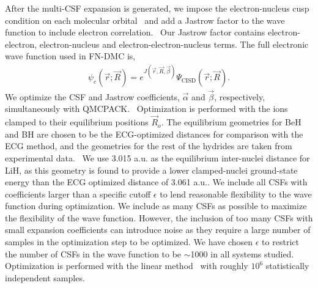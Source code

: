 \documentclass[aip,jcp,numerical,reprint]{revtex4-1}
\begin{document}
After the multi-CSF expansion is generated, we impose the electron-nucleus cusp condition on each molecular orbital~\cite{cusp} and add a Jastrow factor to the wave function to include electron correlation.~\cite{Kato} Our Jastrow factor contains electron-electron, electron-nucleus and electron-electron-nucleus terms. The full electronic wave function used in FN-DMC is,
\begin{align}
\psi_e(\vec{r};\vec{R})=e^{J(\vec{r},\vec{R},\vec{\beta})}\Psi_{\text{CISD}}(\vec{r};\vec{R})\label{eq:psie}.
\end{align}
We optimize the CSF and Jastrow coefficients, $\vec{\alpha}$ and $\vec{\beta}$, respectively, simultaneously with QMCPACK.~\cite{QMCPACK_Kim,QMCPACK_Esler} Optimization is performed with the ions clamped to their equilibrium positions $\vec{R}_o$. The equilibrium geometries for BeH and BH are chosen to be the ECG-optimized distances for comparison with the ECG method, and the geometries for the rest of the hydrides are taken from experimental data.~\cite{CCCBDB} We use 3.015 a.u. as the equilibrium inter-nuclei distance for LiH, as this geometry is found to provide a lower clamped-nuclei ground-state energy than the ECG optimized distance of 3.061 a.u.. We include all CSFs with coefficients larger than a specific cutoff $\epsilon$ to lend reasonable flexibility to the wave function during optimization. We include as many CSFs as possible to maximize the flexibility of the wave function. However, the inclusion of too many CSFs with small expansion coefficients can introduce noise as they require a large number of samples in the optimization step to be optimized. We have chosen $\epsilon$ to restrict the number of CSFs in the wave function to be $\sim$1000 in all systems studied. Optimization is performed with the linear method~\cite{Umrigar_Linear} with roughly $10^6$ statistically independent samples.%

%
\end{document}
